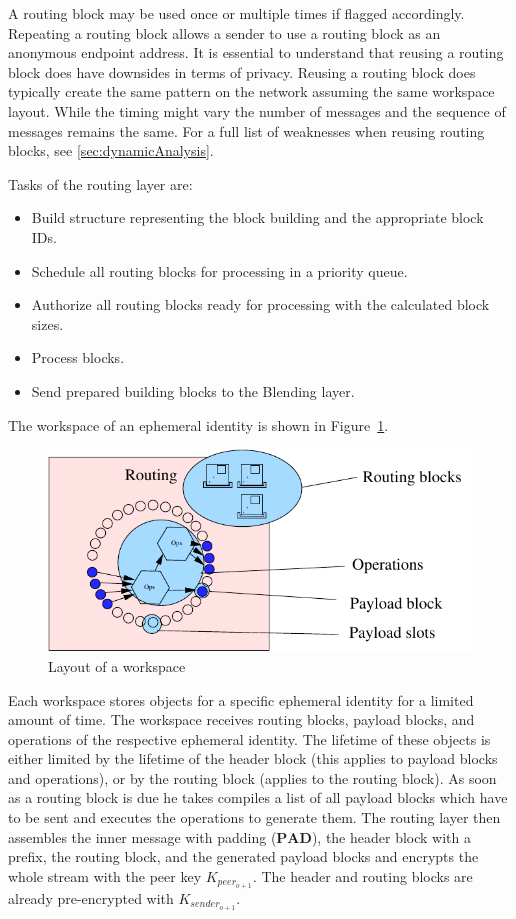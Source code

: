 \documentclass[10pt,journal,compsoc,twocolumn,twoside]{IEEEtran}
\let\MYoriglatexcaption\caption
\renewcommand{\caption}[2][\relax]{\MYoriglatexcaption[#2]{#2}}
\begin{document}
A routing block may be used once or multiple times if flagged accordingly. Repeating a routing block allows a sender to use a routing block as an anonymous endpoint address. It is essential to understand that reusing a routing block does have downsides in terms of privacy. Reusing a routing block does typically create the same pattern on the network assuming the same workspace layout. While the timing might vary the number of messages and the sequence of messages remains the same. For a full list of weaknesses when reusing routing blocks, see \ref{sec:dynamicAnalysis}.

Tasks of the routing layer are:
\begin{itemize}
	\item Build structure representing the block building and the appropriate block IDs.
	\item Schedule all routing blocks for processing in a priority queue.
	\item Authorize all routing blocks ready for processing with the calculated block sizes.
	\item Process blocks.
	\item Send prepared building blocks to the Blending layer.
\end{itemize}

The workspace of an ephemeral identity is shown in Figure~\ref{fig:workspace}.

\begin{figure}[ht]
	\centering\includegraphics[width=0.6\columnwidth]{roughProtocolDesign_workspace}
	\caption{Layout of a workspace}
	\label{fig:workspace}
\end{figure}

Each workspace stores objects for a specific ephemeral identity for a limited amount of time. The workspace receives routing blocks, payload blocks, and operations of the respective ephemeral identity. The lifetime of these objects is either limited by the lifetime of the header block (this applies to payload blocks and operations), or by the routing block (applies to the routing block). As soon as a routing block is due he takes compiles a list of all payload blocks which have to be sent and executes the operations to generate them. The routing layer then assembles the inner message with padding ($\mathbf{PAD}$), the header block with a prefix, the routing block, and the generated payload blocks and encrypts the whole stream with the peer key $K_{peer_{o+1}}$. The header and routing blocks are already pre-encrypted with $K_{sender_{o+1}}$.
\end{document}
